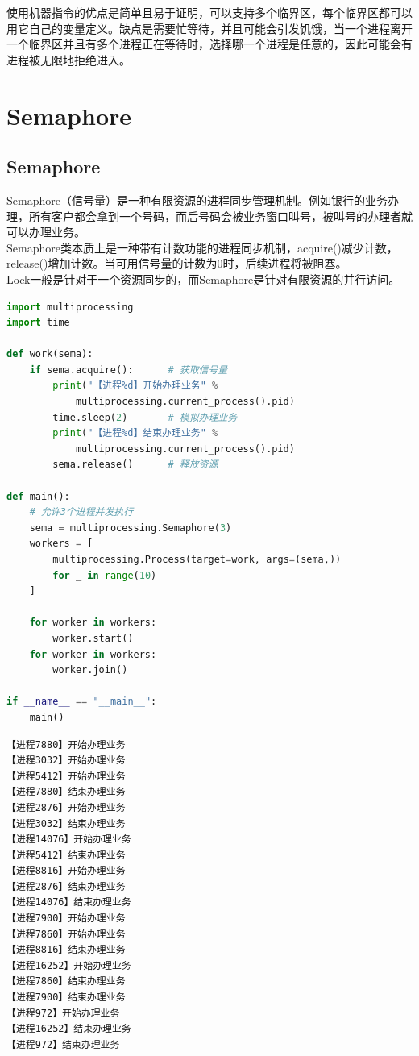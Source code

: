 使用机器指令的优点是简单且易于证明，可以支持多个临界区，每个临界区都可以用它自己的变量定义。缺点是需要忙等待，并且可能会引发饥饿，当一个进程离开一个临界区并且有多个进程正在等待时，选择哪一个进程是任意的，因此可能会有进程被无限地拒绝进入。

\newpage

\section{Semaphore}

\subsection{Semaphore}

Semaphore（信号量）是一种有限资源的进程同步管理机制。例如银行的业务办理，所有客户都会拿到一个号码，而后号码会被业务窗口叫号，被叫号的办理者就可以办理业务。\\

Semaphore类本质上是一种带有计数功能的进程同步机制，acquire()减少计数，release()增加计数。当可用信号量的计数为0时，后续进程将被阻塞。\\

Lock一般是针对于一个资源同步的，而Semaphore是针对有限资源的并行访问。\\


\begin{lstlisting}[language=Python]
import multiprocessing
import time

def work(sema):
	if sema.acquire():      # 获取信号量
		print("【进程%d】开始办理业务" % 
			multiprocessing.current_process().pid)
		time.sleep(2)       # 模拟办理业务
		print("【进程%d】结束办理业务" % 
			multiprocessing.current_process().pid)
		sema.release()      # 释放资源

def main():
	# 允许3个进程并发执行
	sema = multiprocessing.Semaphore(3)
	workers = [
		multiprocessing.Process(target=work, args=(sema,))
		for _ in range(10)
	]

	for worker in workers:
		worker.start()
	for worker in workers:
		worker.join()

if __name__ == "__main__":
	main()
\end{lstlisting}

\begin{tcolorbox}
    \begin{verbatim}
【进程7880】开始办理业务
【进程3032】开始办理业务
【进程5412】开始办理业务
【进程7880】结束办理业务
【进程2876】开始办理业务
【进程3032】结束办理业务
【进程14076】开始办理业务
【进程5412】结束办理业务
【进程8816】开始办理业务
【进程2876】结束办理业务
【进程14076】结束办理业务
【进程7900】开始办理业务 
【进程7860】开始办理业务 
【进程8816】结束办理业务 
【进程16252】开始办理业务
【进程7860】结束办理业务
【进程7900】结束办理业务
【进程972】开始办理业务
【进程16252】结束办理业务
【进程972】结束办理业务
	\end{verbatim}
\end{tcolorbox}


